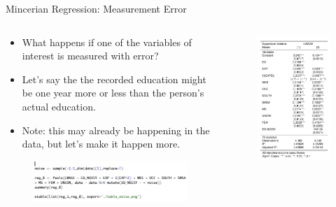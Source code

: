 \begin{frame}{Mincerian Regression: Measurement Error }
\begin{columns}
\begin{column}{0.5\textwidth}
{\small
\begin{itemize}
	\item What happens if one of the variables of interest is measured with error?

	\item Let's say the the recorded education might be one year more or less than the
	person's actual education.

	\item Note: this may already be happening in the data, but let's make it happen more.

\end{itemize}
}
\begin{figure}
\flushleft
	\includegraphics [width=.9\textwidth]	{code_noise}
\end{figure}
\end{column}
\begin{column}{0.5\textwidth}
\begin{figure}
\flushleft
	\includegraphics [width=.6\textwidth]	{table_noise}
\end{figure}
\end{column}
\end{columns}	
\end{frame}




